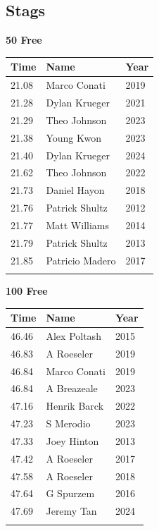 \subsection{Stags}
\vspace{1.2em}
\noindent\begin{minipage}[t]{0.48\textwidth}
\centering
\textbf{\textcolor{teamprimary}{50 Free}}\par
\vspace{0.5em}
\centering
\small
\renewcommand{\arraystretch}{1.0}
\setlength{\tabcolsep}{4pt}
\begin{tabular}{@{}p{1.8cm}p{3.0cm}p{1.0cm}@{}}
\toprule
\textbf{Time} & \textbf{Name} & \textbf{Year} \\
\midrule
21.08 & Marco Conati & 2019 \\
21.28 & Dylan Krueger & 2021 \\
21.29 & Theo Johnson & 2023 \\
21.38 & Young Kwon & 2023 \\
21.40 & Dylan Krueger & 2024 \\
21.62 & Theo Johnson & 2022 \\
21.73 & Daniel Hayon & 2018 \\
21.76 & Patrick Shultz & 2012 \\
21.77 & Matt Williams & 2014 \\
21.79 & Patrick Shultz & 2013 \\
21.85 & Patricio Madero & 2017 \\
\bottomrule
\vspace{0.5em}
\end{tabular}
\end{minipage}
\hfill
\begin{minipage}[t]{0.48\textwidth}
\centering
\textbf{\textcolor{teamprimary}{100 Free}}\par
\vspace{0.5em}
\centering
\small
\renewcommand{\arraystretch}{1.0}
\setlength{\tabcolsep}{4pt}
\begin{tabular}{@{}p{1.8cm}p{3.0cm}p{1.0cm}@{}}
\toprule
\textbf{Time} & \textbf{Name} & \textbf{Year} \\
\midrule
46.46 & Alex Poltash & 2015 \\
46.83 & A Roeseler & 2019 \\
46.84 & Marco Conati & 2019 \\
46.84 & A Breazeale & 2023 \\
47.16 & Henrik Barck & 2022 \\
47.23 & S Merodio & 2023 \\
47.33 & Joey Hinton & 2013 \\
47.42 & A Roeseler & 2017 \\
47.58 & A Roeseler & 2018 \\
47.64 & G Spurzem & 2016 \\
47.69 & Jeremy Tan & 2024 \\
\bottomrule
\vspace{0.5em}
\end{tabular}
\end{minipage}
